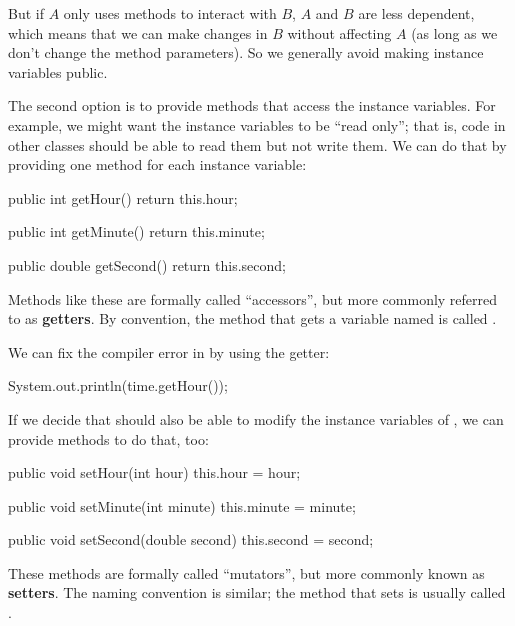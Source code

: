 
But if $A$ only uses methods to interact with $B$, $A$ and $B$ are less dependent, which means that we can make changes in $B$ without affecting $A$ (as long as we don't change the method parameters).
So we generally avoid making instance variables public.

The second option is to provide methods that access the instance variables.
For example, we might want the instance variables to be ``read only''; that is, code in other classes should be able to read them but not write them.
We can do that by providing one method for each instance variable:

\begin{code}
public int getHour() {
    return this.hour;
}

public int getMinute() {
    return this.minute;
}

public double getSecond() {
    return this.second;
}
\end{code}


Methods like these are formally called ``accessors'', but more commonly referred to as {\bf getters}.
By convention, the method that gets a variable named  is called .

We can fix the compiler error in  by using the getter:

\begin{code}
System.out.println(time.getHour());
\end{code}

If we decide that  should also be able to modify the instance variables of , we can provide methods to do that, too:

\begin{code}
public void setHour(int hour) {
    this.hour = hour;
}

public void setMinute(int minute) {
    this.minute = minute;
}

public void setSecond(double second) {
    this.second = second;
}
\end{code}


These methods are formally called ``mutators'', but more commonly known as {\bf setters}.
The naming convention is similar; the method that sets  is usually called .


